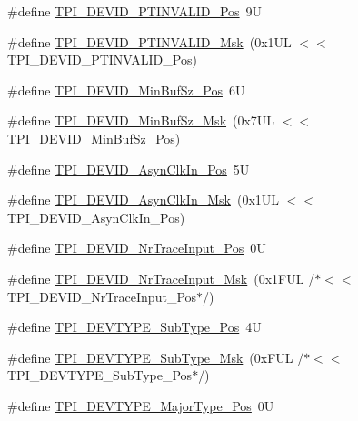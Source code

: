 \begin{DoxyCompactItemize}
\#define \mbox{\hyperlink{group___c_m_s_i_s___t_p_i_ga974cccf4c958b4a45cb71c7b5de39b7b}{T\+P\+I\+\_\+\+D\+E\+V\+I\+D\+\_\+\+P\+T\+I\+N\+V\+A\+L\+I\+D\+\_\+\+Pos}}~9U
\item 
\#define \mbox{\hyperlink{group___c_m_s_i_s___t_p_i_ga1ca84d62243e475836bba02516ba6b97}{T\+P\+I\+\_\+\+D\+E\+V\+I\+D\+\_\+\+P\+T\+I\+N\+V\+A\+L\+I\+D\+\_\+\+Msk}}~(0x1\+U\+L $<$$<$ T\+P\+I\+\_\+\+D\+E\+V\+I\+D\+\_\+\+P\+T\+I\+N\+V\+A\+L\+I\+D\+\_\+\+Pos)
\item 
\#define \mbox{\hyperlink{group___c_m_s_i_s___t_p_i_ga3f7da5de2a34be41a092e5eddd22ac4d}{T\+P\+I\+\_\+\+D\+E\+V\+I\+D\+\_\+\+Min\+Buf\+Sz\+\_\+\+Pos}}~6U
\item 
\#define \mbox{\hyperlink{group___c_m_s_i_s___t_p_i_ga939e068ff3f1a65b35187ab34a342cd8}{T\+P\+I\+\_\+\+D\+E\+V\+I\+D\+\_\+\+Min\+Buf\+Sz\+\_\+\+Msk}}~(0x7\+U\+L $<$$<$ T\+P\+I\+\_\+\+D\+E\+V\+I\+D\+\_\+\+Min\+Buf\+Sz\+\_\+\+Pos)
\item 
\#define \mbox{\hyperlink{group___c_m_s_i_s___t_p_i_gab382b1296b5efd057be606eb8f768df8}{T\+P\+I\+\_\+\+D\+E\+V\+I\+D\+\_\+\+Asyn\+Clk\+In\+\_\+\+Pos}}~5U
\item 
\#define \mbox{\hyperlink{group___c_m_s_i_s___t_p_i_gab67830557d2d10be882284275025a2d3}{T\+P\+I\+\_\+\+D\+E\+V\+I\+D\+\_\+\+Asyn\+Clk\+In\+\_\+\+Msk}}~(0x1\+U\+L $<$$<$ T\+P\+I\+\_\+\+D\+E\+V\+I\+D\+\_\+\+Asyn\+Clk\+In\+\_\+\+Pos)
\item 
\#define \mbox{\hyperlink{group___c_m_s_i_s___t_p_i_ga80ecae7fec479e80e583f545996868ed}{T\+P\+I\+\_\+\+D\+E\+V\+I\+D\+\_\+\+Nr\+Trace\+Input\+\_\+\+Pos}}~0U
\item 
\#define \mbox{\hyperlink{group___c_m_s_i_s___t_p_i_gabed454418d2140043cd65ec899abd97f}{T\+P\+I\+\_\+\+D\+E\+V\+I\+D\+\_\+\+Nr\+Trace\+Input\+\_\+\+Msk}}~(0x1\+F\+U\+L /$\ast$$<$$<$ T\+P\+I\+\_\+\+D\+E\+V\+I\+D\+\_\+\+Nr\+Trace\+Input\+\_\+\+Pos$\ast$/)
\item 
\#define \mbox{\hyperlink{group___c_m_s_i_s___t_p_i_ga0c799ff892af5eb3162d152abc00af7a}{T\+P\+I\+\_\+\+D\+E\+V\+T\+Y\+P\+E\+\_\+\+Sub\+Type\+\_\+\+Pos}}~4U
\item 
\#define \mbox{\hyperlink{group___c_m_s_i_s___t_p_i_ga5b2fd7dddaf5f64855d9c0696acd65c1}{T\+P\+I\+\_\+\+D\+E\+V\+T\+Y\+P\+E\+\_\+\+Sub\+Type\+\_\+\+Msk}}~(0x\+F\+U\+L /$\ast$$<$$<$ T\+P\+I\+\_\+\+D\+E\+V\+T\+Y\+P\+E\+\_\+\+Sub\+Type\+\_\+\+Pos$\ast$/)
\item 
\#define \mbox{\hyperlink{group___c_m_s_i_s___t_p_i_ga69c4892d332755a9f64c1680497cebdd}{T\+P\+I\+\_\+\+D\+E\+V\+T\+Y\+P\+E\+\_\+\+Major\+Type\+\_\+\+Pos}}~0U
$$
\end{DoxyCompactItemize}
